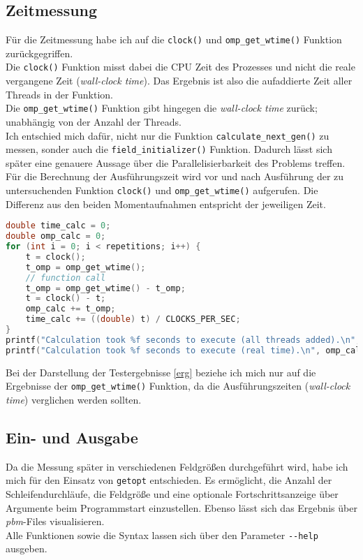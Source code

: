 \documentclass[german,plainarticle,hyperref,utf8]{zihpub}
\begin{document}
	\subsection{Zeitmessung}
	
	Für die Zeitmessung habe ich auf die \texttt{clock()} und \texttt{omp\_get\_wtime()} Funktion zurückgegriffen.\\
	
	Die \texttt{clock()} Funktion misst dabei die CPU Zeit des Prozesses und nicht die reale vergangene Zeit (\textit{wall-clock time}). Das Ergebnis ist also die aufaddierte Zeit aller Threads in der Funktion.\\
	
	Die \texttt{omp\_get\_wtime()} Funktion gibt hingegen die \textit{wall-clock time} zurück; unabhängig von der Anzahl der Threads.\\
	
	Ich entschied mich dafür, nicht nur die Funktion \texttt{calculate\_next\_gen()} zu messen, sonder auch die \texttt{field\_initializer()} Funktion. Dadurch lässt sich später eine genauere Aussage über die Parallelisierbarkeit des Problems treffen. Für die Berechnung der Ausführungszeit wird vor und nach Ausführung der zu untersuchenden Funktion \texttt{clock()} und \texttt{omp\_get\_wtime()} aufgerufen. Die Differenz aus den beiden Momentaufnahmen entspricht der jeweiligen Zeit.\\
	\newpage
	\begin{lstlisting}[language=C, caption=Berechnung der Ausführungszeit eines \textit{function calls}]
double time_calc = 0;
double omp_calc = 0;
for (int i = 0; i < repetitions; i++) {
	t = clock();
	t_omp = omp_get_wtime();
	// function call
	t_omp = omp_get_wtime() - t_omp;
	t = clock() - t;
	omp_calc += t_omp;
	time_calc += ((double) t) / CLOCKS_PER_SEC;
}
printf("Calculation took %f seconds to execute (all threads added).\n", time_calc);
printf("Calculation took %f seconds to execute (real time).\n", omp_calc);
\end{lstlisting}

	Bei der Darstellung der Testergebnisse \ref{erg} beziehe ich mich nur auf die Ergebnisse der \texttt{omp\_get\_wtime()} Funktion, da die Ausführungszeiten (\textit{wall-clock time}) verglichen werden sollten.
	
	\subsection{Ein- und Ausgabe}
	Da die Messung später in verschiedenen Feldgrößen durchgeführt wird, habe ich mich für den Einsatz von \verb|getopt| entschieden. Es ermöglicht, die Anzahl der Schleifendurchläufe, die Feldgröße und eine optionale Fortschrittsanzeige über Argumente beim Programmstart einzustellen.
	Ebenso lässt sich das Ergebnis über \textit{pbm}-Files visualisieren.\\
	Alle Funktionen sowie die Syntax lassen sich über den Parameter \texttt{-{}-help} ausgeben.
	\newpage
\end{document}
